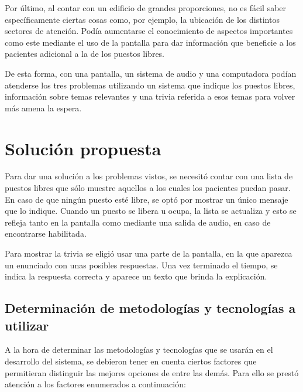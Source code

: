 \documentclass{article}
\begin{document}
Por último, al contar con un edificio de grandes proporciones, no es fácil saber específicamente ciertas cosas como, por ejemplo, la ubicación de los distintos sectores de atención. Podía aumentarse el conocimiento de aspectos importantes como este mediante el uso de la pantalla para dar información que beneficie a los pacientes adicional a la de los puestos libres.

De esta forma, con una pantalla, un sistema de audio y una computadora podían atenderse los tres problemas utilizando un sistema que indique los puestos libres, información sobre temas relevantes y una trivia referida a esos temas para volver más amena la espera.
\newpage
\section{Solución propuesta}
Para dar una solución a los problemas vistos, se necesitó contar con una lista de puestos libres que sólo muestre aquellos a los cuales los pacientes puedan pasar. En caso de que ningún puesto esté libre, se optó por mostrar un único mensaje que lo indique. Cuando un puesto se libera u ocupa, la lista se actualiza y esto se refleja tanto en la pantalla como mediante una salida de audio, en caso de encontrarse habilitada.

Para mostrar la trivia se eligió usar una parte de la pantalla, en la que aparezca un enunciado con unas posibles respuestas. Una vez terminado el tiempo, se indica la respuesta correcta y aparece un texto que brinda la explicación.
\newpage
\subsection{Determinación de metodologías y tecnologías a utilizar}
A la hora de determinar las metodologías y tecnologías que se usarán en el desarrollo del sistema, se debieron tener en cuenta ciertos factores que permitieran distinguir las mejores opciones de entre las demás. Para ello se prestó atención a los factores enumerados a continuación:
\end{document}
